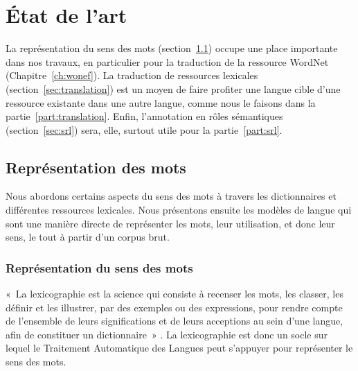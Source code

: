 

\chapter{État de l'art} 
\label{ch:etatdelart} 

La représentation du sens des mots (section~\ref{sec:mots}) occupe une place
importante dans nos travaux, en particulier pour la traduction de la ressource
WordNet (Chapitre~\ref{ch:wonef}). La traduction de ressources lexicales
(section~\ref{sec:translation}) est un moyen de faire profiter une langue cible
d'une ressource existante dans une autre langue, comme nous le faisons dans la
partie~\ref{part:translation}. Enfin, l'annotation en rôles sémantiques
(section~\ref{sec:srl}) sera, elle, surtout utile pour la
partie~\ref{part:srl}.

\section{Représentation des mots}
\label{sec:mots}

Nous abordons certains aspects du sens des mots à travers les dictionnaires et
différentes ressources lexicales. Nous présentons ensuite les modèles de langue
qui sont une manière directe de représenter les mots, leur utilisation, et donc
leur sens, le tout à partir d'un corpus brut.

\subsection{Représentation du sens des mots}
\label{subsec:sens_mots}

«~La lexicographie est la science qui consiste à recenser les mots, les
classer, les définir et les illustrer, par des exemples ou des expressions,
pour rendre compte de l'ensemble de leurs significations et de leurs acceptions
au sein d'une langue, afin de constituer un dictionnaire~»
\citep{wikipedia2014lexicographie}. La lexicographie est donc un socle sur
lequel le Traitement Automatique des Langues peut s'appuyer pour représenter le
sens des mots.

